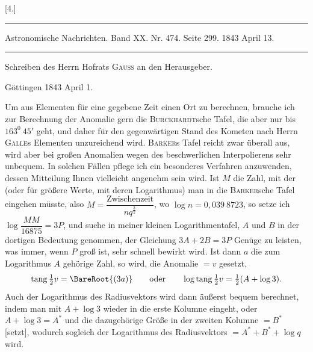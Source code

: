 \clearpage
\hypertarget{native-377-letter4}{}\label{native-377-letter4}
\begin{center}
[4.]\par\medskip
\rule{\linewidth}{.4pt}\par
{\small Astronomische Nachrichten. Band XX. Nr. 474. Seite 299. 1843 April 13.}\par
\rule{\linewidth}{.4pt}\par\medskip
Schreiben des Herrn Hofrats \textsc{Gauss} an den Herausgeber.\par
Göttingen 1843 April 1.
\end{center}
\noindent\hspace*{\parindent}Um aus Elementen für eine gegebene Zeit einen Ort zu berechnen, brauche ich zur Berechnung der Anomalie gern die \textsc{Burckhardt}sche Tafel, die aber nur bis \(163^0\ 45'\) geht, und daher für den gegenwärtigen Stand des Kometen nach Herrn \textsc{Galle}s Elementen unzureichend wird. \textsc{Barker}s Tafel reicht zwar überall aus, wird aber bei großen Anomalien wegen des beschwerlichen Interpolierens sehr unbequem. In solchen Fällen pflege ich ein besonderes Verfahren anzuwenden, dessen Mitteilung Ihnen vielleicht angenehm sein wird. Ist \(M\) die Zahl, mit der (oder für größere Werte, mit deren Logarithmus) man in die \textsc{Barker}sche Tafel eingehen müsste, also \(M=\dfrac{\text{Zwischenzeit}}{nq^{\frac32}}\), wo \(\log n=0{,}039\ 8723\), so setze ich \(\log\dfrac{MM}{16875}=3P\), und suche in meiner kleinen Logarithmentafel, \(A\) und \(B\) in der dortigen Bedeutung genommen, der Gleichung \(3A+2B=3P\) Genüge zu leisten, was immer, wenn \(P\) groß ist, sehr schnell bewirkt wird. Ist dann \(a\) die zum Logarithmus \(A\) gehörige Zahl, so wird, die Anomalie \(=v\) gesetzt,
\[
\mathrm{tang}\,\tfrac12v=\BareRoot{(3a)}\qquad\text{oder}\qquad\log\mathrm{tang}\,\tfrac12v=\tfrac12(A+\log3).
\]
Auch der Logarithmus des Radiusvektors wird dann äußerst bequem berechnet, indem man mit \(A+\log3\) wieder in die erste Kolumne eingeht, oder \(A+\log3=A^*\) und die dazugehörige Größe in der zweiten Kolumne \(=B^*\) [setzt], wodurch sogleich der Logarithmus des Radiusvektors \(=A^*+B^*+\log q\) wird.
\par
